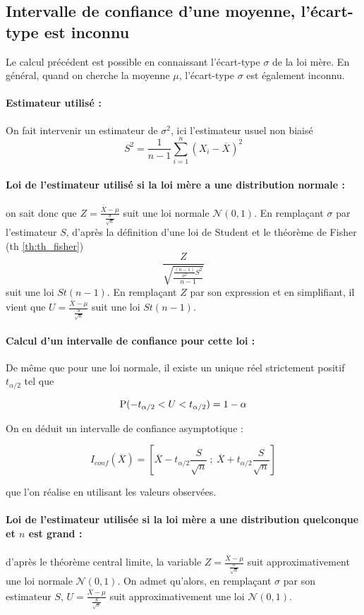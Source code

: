 \subsection{Intervalle de confiance d'une moyenne, l'écart-type est inconnu}
Le calcul précédent est possible en connaissant l'écart-type $\sigma$ de la loi mère. En général, quand on cherche la moyenne $\mu$, l'écart-type $\sigma$ est également inconnu. 

\paragraph{Estimateur utilisé :} On fait intervenir un estimateur de $\sigma^2$, ici l'estimateur usuel non biaisé $$S^2=\frac{1}{n-1}\sum_{i=1}^n (X_i-\overline{X})^2$$

\paragraph{Loi de l'estimateur utilisé si la loi mère a une distribution normale :} on sait donc que $Z=\frac{\overline{X}-\mu}{\frac{\sigma}{\sqrt{n}}}$ suit une loi normale $\mathcal{N}\left(0,1 \right)$. En remplaçant $\sigma$ par l'estimateur $S$, 
d'après la définition d'une loi de Student et le théorème de Fisher (th \ref{th:th_fisher})
 $$\frac{Z}{\sqrt{\frac{\frac{(n-1)}{\sigma^2}S^2}{n-1}}}$$ suit une loi $St(n-1)$.  En remplaçant $Z$ par son expression et en simplifiant, il vient que $U=\frac{\overline{X}-\mu}{\frac{S}{\sqrt{n}}}$ suit une loi $St(n-1)$.

\paragraph{Calcul d'un intervalle de confiance pour cette loi :} De même que pour une loi normale, il existe un unique réel strictement positif $t_{\alpha/2}$ tel que 

$$\operatorname{P}(-t_{\alpha/2} < U < t_{\alpha/2}) = 1-\alpha$$

On en déduit un intervalle de confiance asymptotique :

$$I_{conf}(\overline{X})=\left[\overline{X}-t_{\alpha/2} \frac{S}{\sqrt{n}}~;~\overline{X} + t_{\alpha/2} \frac{S}{\sqrt{n}} \right]$$

que l'on réalise en utilisant les valeurs observées.  

\paragraph{Loi de l'estimateur utilisée si la loi mère a une distribution quelconque et $n$ est grand :} d'après le théorème central limite, la variable  $Z=\frac{\overline{X}-\mu}{\frac{\sigma}{\sqrt{n}}}$ suit approximativement une loi normale $\mathcal{N}\left(0,1 \right)$. On admet qu'alors, en remplaçant $\sigma$ par son estimateur $S$, $U=\frac{\overline{X}-\mu}{\frac{S}{\sqrt{n}}}$ suit approximativement une loi $\mathcal{N}\left(0,1 \right)$.

